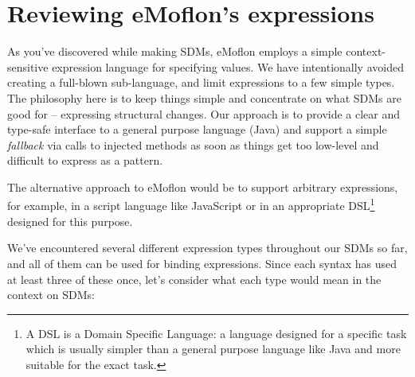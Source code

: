 \newpage
\section{Reviewing eMoflon's expressions}
\genHeader

As you've discovered while making SDMs, eMoflon employs a simple context-sensitive expression language for specifying  values. We have intentionally avoided
creating a full-blown sub-language, and limit expressions to a few simple types. The philosophy here is to keep things simple and concentrate on what SDMs are good for -- expressing structural
changes. Our approach is to provide a clear and type-safe interface to a general purpose language (Java) and support a simple \emph{fallback} via calls to
injected methods as soon as things get too low-level and difficult to express as a pattern.

The alternative approach to eMoflon would be to support arbitrary expressions, for example, in a script language like JavaScript or in an appropriate
DSL\footnote{A DSL is a Domain Specific Language: a language designed for a specific task which is usually simpler than a general purpose language like Java and
more suitable for the exact task.} designed for this purpose. 

We've encountered several different expression types throughout our SDMs so far, and all of them can be used for binding expressions. Since each syntax has
used at least three of these once, let's consider what each type would mean in the context on SDMs:

